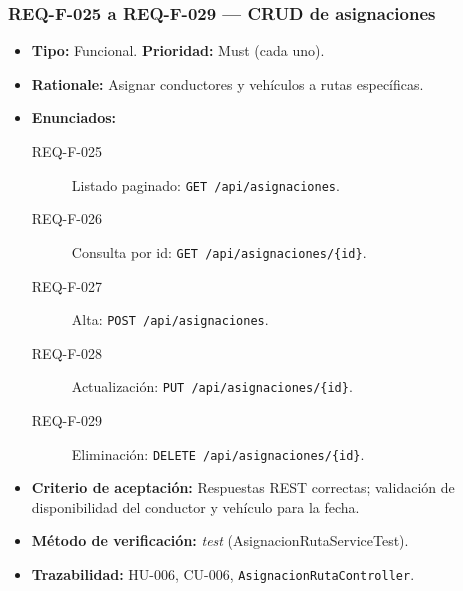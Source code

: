 \documentclass[12pt,a4paper]{article}
\begin{document}
\subsubsection{REQ-F-025 a REQ-F-029 — CRUD de asignaciones}
\begin{itemize}
  \item \textbf{Tipo:} Funcional. \textbf{Prioridad:} Must (cada uno).
  \item \textbf{Rationale:} Asignar conductores y vehículos a rutas específicas.
  \item \textbf{Enunciados:}
    \begin{description}
      \item[REQ-F-025] Listado paginado: \texttt{GET /api/asignaciones}.
      \item[REQ-F-026] Consulta por id: \texttt{GET /api/asignaciones/\{id\}}.
      \item[REQ-F-027] Alta: \texttt{POST /api/asignaciones}.
      \item[REQ-F-028] Actualización: \texttt{PUT /api/asignaciones/\{id\}}.
      \item[REQ-F-029] Eliminación: \texttt{DELETE /api/asignaciones/\{id\}}.
    \end{description}
  \item \textbf{Criterio de aceptación:} Respuestas REST correctas; validación de disponibilidad
  del conductor y vehículo para la fecha.
  \item \textbf{Método de verificación:} \textit{test} (AsignacionRutaServiceTest).
  \item \textbf{Trazabilidad:} HU-006, CU-006, \texttt{AsignacionRutaController}.
\end{itemize}

\end{document}
